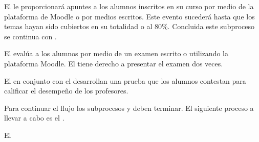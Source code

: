 \begin{PDescripcion}
	\Ppaso[\PSubProceso]  El  le proporcionará apuntes a los alumnos inscritos en su curso por medio de la plataforma de Moodle o por medios escritos. Este evento sucederá hasta que los temas hayan sido cubiertos en su totalidad o al 80\%. Concluida este subproceso se continua con .
	
	\Ppaso[\PSubProceso]  El  evalúa a los alumnos por medio de un examen escrito o utilizando la plataforma Moodle. El  tiene derecho a presentar el examen dos veces.
	
	\Ppaso[\PSubProceso]  El  en conjunto con el  desarrollan una prueba que los alumnos contestan para calificar el desempeño de los profesores.
	
	\Ppaso[\iCompuerta] Para continuar el flujo los subprocesos  y  deben terminar. El siguiente proceso a llevar a cabo es el .
	
	\Ppaso[\PSubProceso] El 
	
\end{PDescripcion}
